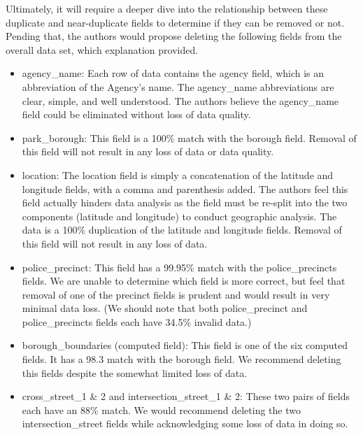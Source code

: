 \documentclass[12pt, titlepage]{article}
\begin{document}
{Ultimately, it will require a deeper dive into the relationship 
between these duplicate and near-duplicate fields to determine 
if they can be removed or not. Pending that, the authors would propose 
deleting the following fields from the overall data set, 
which explanation provided.
 
 	\begin{itemize}
		    \item agency\_name: Each row of data contains the agency field, 
		    which is an abbreviation of the Agency's name. The agency\_name 
		    abbreviations are clear, simple, and well understood. The 
		    authors believe the agency\_name field could be eliminated 
		    without loss of data quality. 
		    
		    \item park\_borough:  This field is a 100\% match with the 
		    borough field. Removal of this field will not result in any loss of 
		    data or data quality.
		    
		    \item location:  The location field is simply a concatenation of 
		    the latitude and longitude fields, with a comma and parenthesis 
		    added. The authors feel this field actually hinders data analysis 
		    as the field must be re-split into the two components 
		    (latitude and longitude) to conduct geographic analysis. The data is 
		    a 100\% duplication of the latitude and longitude fields. Removal 
		    of this field will not result in any loss of data.
		    
		    \item police\_precinct: This field has a 99.95\% match with the 
		    police\_precincts fields. We are unable to determine which field 
		    is more correct, but feel that removal of one of the precinct fields 
		    is prudent and would result in very minimal data loss. (We 
		    should note that both police\_precinct and police\_precincts 
		    fields each have 34.5\% invalid data.)
		   
		   \item borough\_boundaries (computed field): This field is one of 
		   the six computed fields. It has a 98.3 match with the borough 
		   field. We recommend deleting this fields despite the somewhat 
		   limited loss of data. 
		    
		    \item cross\_street\_1 \& 2 and intersection\_street\_1 \& 2: These 
		    two pairs of fields each have an 88\% match. We would recommend 
		    deleting the two intersection\_street fields while acknowledging 
		    some loss of data in doing so.
		     

\end{itemize}}
\end{document}

